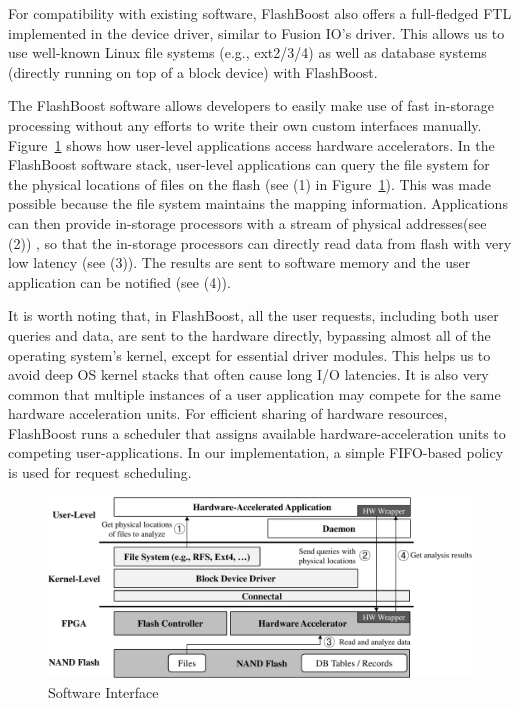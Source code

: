 For compatibility with existing software, FlashBoost also offers a full-fledged
FTL implemented in the device driver, similar to Fusion IO's driver. 
This allows us to use well-known Linux file systems (e.g.,
ext2/3/4) as well as database systems (directly running on top of a block
device) with FlashBoost.

The FlashBoost software allows developers to easily make use of fast in-storage
processing without any efforts to write their own custom interfaces manually.
Figure~\ref{fig:filesystem} shows how user-level applications access hardware
accelerators.  In the FlashBoost software stack, user-level applications can
query the file system for the physical locations of files on the flash (see (1)
in Figure~\ref{fig:filesystem}). This was made possible because the file system
maintains the mapping information.  Applications can then provide in-storage
processors with a stream of physical addresses(see (2))
, so that the in-storage processors can directly read
data from flash with very low latency (see (3)).
The results are sent to software memory and the user application can be notified
(see (4)).

It is worth noting that, in FlashBoost, all the user requests, including both
user queries and data, are sent to the hardware directly, bypassing almost all
of the operating system's kernel, except for essential driver modules.  This helps us to avoid deep OS
kernel stacks that often cause long I/O latencies.  It is also very common that
multiple instances of a user application may compete for the same hardware
acceleration units. For efficient sharing of hardware resources, FlashBoost runs
a scheduler that assigns available hardware-acceleration units to competing
user-applications. In our implementation, a simple FIFO-based policy is used for
request scheduling.

\begin{figure}[h]
	\begin{center}
	\includegraphics[width=0.4\paperwidth]{figures/software.pdf}
	\caption{Software Interface}
	\label{fig:filesystem}
	\end{center}
\end{figure}
